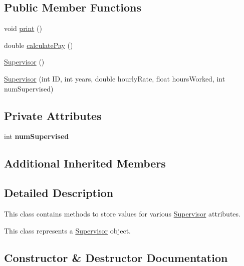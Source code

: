 \subsection*{Public Member Functions}
\begin{DoxyCompactItemize}
\item 
void \hyperlink{classSupervisor_a92483dc9a54904d79b46c6ec4efb3f54}{print} ()
\item 
double \hyperlink{classSupervisor_aa37daa89523c08b84ae8141299e036f8}{calculate\+Pay} ()
\item 
\hyperlink{classSupervisor_a9d7eafc36b5429092ba0f758bc7841c4}{Supervisor} ()
\item 
\hyperlink{classSupervisor_a02d9245744652deb20e9408001d6ed3b}{Supervisor} (int ID, int years, double hourly\+Rate, float hours\+Worked, int num\+Supervised)
\end{DoxyCompactItemize}
\subsection*{Private Attributes}
\begin{DoxyCompactItemize}
\item 
\mbox{\label{classSupervisor_af8b7097d8147c93a68d1f63c5b898797}} 
int {\bfseries num\+Supervised}
\end{DoxyCompactItemize}
\subsection*{Additional Inherited Members}


\subsection{Detailed Description}
This class contains methods to store values for various \hyperlink{classSupervisor}{Supervisor} attributes. 

This class represents a \hyperlink{classSupervisor}{Supervisor} object. 

\subsection{Constructor \& Destructor Documentation}
\mbox{\label{classSupervisor_a9d7eafc36b5429092ba0f758bc7841c4}} 
